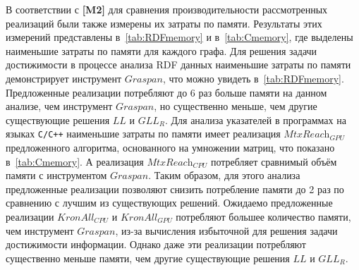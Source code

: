 В соответствии с \textbf{[M2]} для сравнения производительности рассмотренных реализаций были также измерены их затраты по памяти. Результаты этих измерений представлены в~\cref{tab:RDFmemory} и в~\cref{tab:Cmemory}, где выделены наименьшие затраты по памяти для каждого графа. Для решения задачи достижимости в процессе анализа RDF данных наименьшие затраты по памяти демонстрирует инструмент $\textit{Graspan}$, что можно увидеть в~\cref{tab:RDFmemory}. Предложенные реализации потребляют до 6 раз больше памяти на данном анализе, чем инструмент $\textit{Graspan}$, но существенно меньше, чем другие существующие решения $\textit{LL}$ и $\textit{GLL}_{\textit{R}}$. Для анализа указателей в программах на языках \texttt{C/C++} наименьшие затраты по памяти имеет реализация $\textit{MtxReach}_{\textit{GPU}}$ предложенного алгоритма, основанного на умножении матриц, что показано в~\cref{tab:Cmemory}. А реализация $\textit{MtxReach}_{\textit{CPU}}$ потребляет сравнимый объём памяти с инструментом $\textit{Graspan}$. Таким образом, для этого анализа предложенные реализации позволяют снизить потребление памяти до 2 раз по сравнению с лучшим из существующих решений. Ожидаемо предложенные реализации $\textit{KronAll}_{\textit{CPU}}$ и $\textit{KronAll}_{\textit{GPU}}$ потребляют большее количество памяти, чем инструмент $\textit{Graspan}$, из-за вычисления избыточной для решения задачи достижимости информации. Однако даже эти реализации потребляют существенно меньше памяти, чем другие существующие решения $\textit{LL}$ и $\textit{GLL}_{\textit{R}}$.

